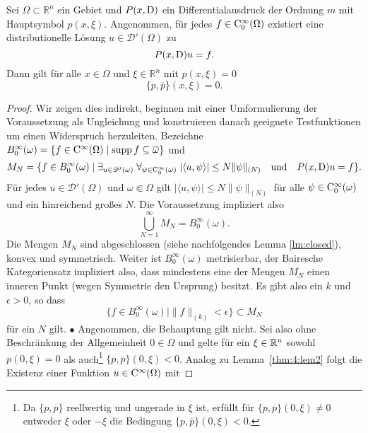 \begin{thm}\label{thm:3.1_hoer}
Sei $\Omega\subset\mathbb{R}^n$ ein Gebiet und $P(x,\mathrm D)$ ein Differentialausdruck der Ordnung $m$ mit Hauptsymbol $p(x,\xi)$.
Angenommen, für jedes $f\in \mathrm C_0^\infty(\Omega)$  existiert eine distributionelle Lösung $u\in\mathscr D'(\Omega)$ zu
\begin{equation}\label{eq:3.1_hoer}
P(x,\mathrm D)u=f.
\end{equation}
Dann gilt für alle $x\in\Omega$ und $\xi\in\mathbb{R}^n$ mit $p(x,\xi)=0$
\begin{equation}\label{eq:3.1_hoer_aussage}
 \{p,\overline{p}\}(x,\xi)=0.
\end{equation}
\end{thm}
\begin{proof}
Wir zeigen dies indirekt, beginnen mit einer Umformulierung der Voraussetzung als Ungleichung und konstruieren danach geeignete Testfunktionen um einen Widerspruch herzuleiten. 
 Bezeichne $B^\infty_0(\omega)=\{f\in\mathrm C^\infty(\Omega) \mid \operatorname{supp} f\subseteq\overline\omega\}$ und 
\begin{equation}\label{eq:M_N}
   M_N = \{ f\in B^\infty_0(\omega)\mid \exists_{u\in\mathscr D'(\omega)} \; \forall_{\psi\in\mathrm C_0^\infty(\omega)}\; |\langle u,\psi\rangle | \le N \|\psi\|_{(N)} \quad\text{und}\quad P(x,\mathrm D)u=f \}.
\end{equation}
Für jedes $u\in\mathscr D'(\Omega)$ und $\omega\Subset\Omega$ gilt $ |\langle u,\psi\rangle | \le N \|\psi\|_{(N)}$ für alle $\psi\in\mathrm C_0^\infty(\omega)$ und ein hinreichend großes $N$. Die Voraussetzung impliziert also
\begin{equation}
   \bigcup_{N=1}^\infty M_N = B^\infty_0(\omega).
\end{equation} 
Die Mengen $M_N$ sind abgeschlossen (siehe nachfolgendes Lemma \ref{lm:closed}),  konvex und symmetrisch. Weiter ist $B^\infty_0(\omega)$ metrisierbar, der Bairesche Kategoriensatz impliziert also, dass mindestens eine der Mengen $M_N$ einen inneren Punkt (wegen Symmetrie den Ursprung) besitzt. Es gibt also ein $k$ und $\epsilon>0$, so dass
\begin{equation}\label{eq:fepsInMN}
    \{ f\in B^\infty_0(\omega)\mid \|f\|_{(k)}<\epsilon\} \subset M_N
\end{equation}
für ein $N$ gilt.
%
$\bullet$ 
Angenommen, die Behauptung gilt nicht. Sei also ohne Beschränkung der Allgemeinheit $0\in\Omega$ und gelte für ein $\xi\in\mathbb R^n$ sowohl $p(0,\xi)=0$ als auch\footnote{Da $\{p,\overline p\}$ reellwertig und ungerade in $\xi$ ist, erfüllt für $\{p,\overline p\}(0,\xi)\ne0$ entweder $\xi$ oder $-\xi$ die Bedingung $\{p,\overline p\}(0,\xi)<0$.}   $\{p,\overline p\}(0,\xi)<0$. Analog zu Lemma~\ref{thm:4:lem2} folgt die Existenz einer Funktion $u\in\mathrm C^\infty(\Omega)$ mit 

\end{proof}
